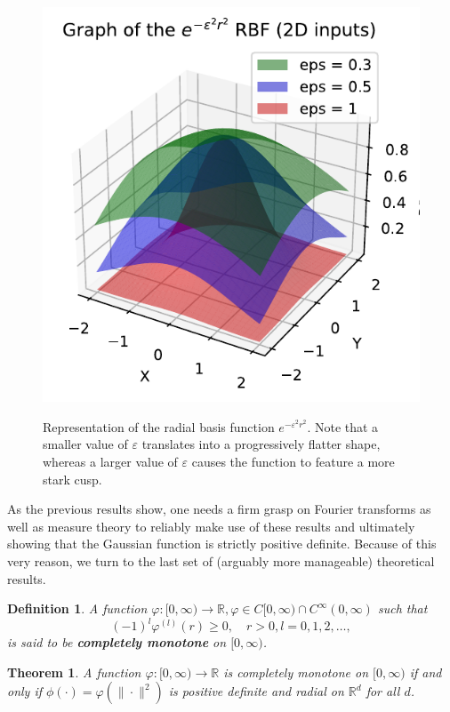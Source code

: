 \documentclass[12pt]{report} %
\newtheorem{definition}{Definition}
\newtheorem{theorem}{Theorem}
\newcommand{\tmstrong}[1]{\textbf{#1}}
\begin{document}
\begin{figure}[ht]
  \centering
  {\includegraphics[width=.5\textwidth, clip=true, trim={0 0 .1cm 0}]{imagenes/rbf_discussion/negative-exp-rbf.pdf}}
  \caption{Representation of the radial basis function $e^{-\varepsilon^2 r^2}$. Note that a smaller value of $\varepsilon$ translates into a progressively flatter shape, whereas a larger value of $\varepsilon$ causes the function to feature a more stark cusp.}
  \label{fig:negative-exp-rbf}
\end{figure}

As the previous results show, one needs a firm grasp on Fourier transforms as well as
measure theory to reliably make use of these results and ultimately showing that
the Gaussian function is strictly positive definite. Because of this very reason, we turn
to the last set of (arguably more manageable) theoretical results.


\begin{definition}
  A function $\varphi : [0, \infty) \rightarrow \mathbb{R}, \varphi \in C [0,
    \infty) \cap C^{\infty} (0, \infty)$ such that
  \[ (- 1)^{l} \varphi^{(l)} (r) \geq 0, \quad r > 0,
    l= 0, 1, 2, \ldots, \]
  is said to be {\tmstrong{completely monotone}} on $[0, \infty)$.
\end{definition}

\begin{theorem}
  \label{thm-completely-monotone-iff-positive-definite-radial}A function
  $\varphi : [0, \infty) \rightarrow \mathbb{R}$ is completely monotone on
  $[0, \infty)$ if and only if $\phi (\cdot) = \varphi (\| \cdot \|^2)$ is
  positive definite and radial on $\mathbb{R}^d$ for all $d$.
\end{theorem}
\end{document}
